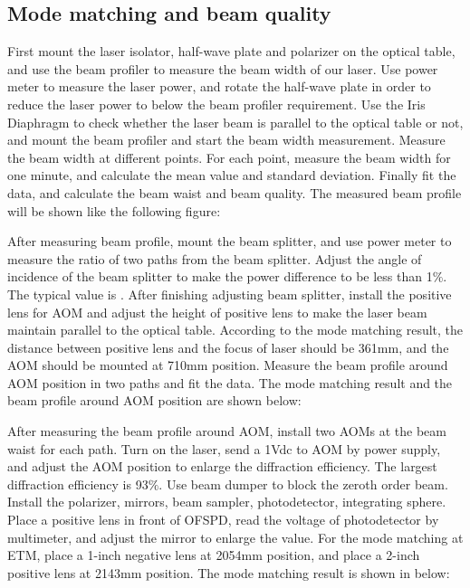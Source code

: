 \subsection{Mode matching and beam quality}
First mount the laser isolator, half-wave plate and polarizer on the optical table, and use the \underline{\qquad\qquad} beam profiler to measure the beam width of our laser. Use power meter to measure the laser power, and rotate the half-wave plate in order to reduce the laser power to below the beam profiler requirement. Use the Iris Diaphragm to check whether the laser beam is parallel to the optical table or not, and mount the beam profiler and start the beam width measurement. Measure the beam width at different points. For each point, measure the beam width for one minute, and calculate the mean value and standard deviation. Finally fit the data, and calculate the beam waist and beam quality. The measured beam profile will be shown like the following figure:


After measuring beam profile, mount the beam splitter, and use power meter to measure the ratio of two paths from the beam splitter. Adjust the angle of incidence of the beam splitter to make the power difference to be less than 1$\%$. The typical value is \underline{\qquad\qquad}. After finishing adjusting beam splitter, install the positive lens for AOM and adjust the height of positive lens to make the laser beam maintain parallel to the optical table. According to the mode matching result, the distance between positive lens and the focus of laser should be 361mm, and the AOM should be mounted at 710mm position. Measure the beam profile around AOM position in two paths and fit the data. The mode matching result and the beam profile around AOM position are shown below:




After measuring the beam profile around AOM, install two AOMs at the beam waist for each path. Turn on the laser, send a 1Vdc to AOM by power supply, and adjust the AOM position to enlarge the diffraction efficiency. The largest diffraction efficiency is 93$\%$. Use beam dumper to block the zeroth order beam. Install the polarizer, mirrors, beam sampler, photodetector, integrating sphere. Place a positive lens in front of OFSPD, read the voltage of photodetector by multimeter, and adjust the mirror to enlarge the value. For the mode matching at ETM, place a 1-inch negative lens at 2054mm position, and place a 2-inch positive lens at 2143mm position. The mode matching result is shown in below:

